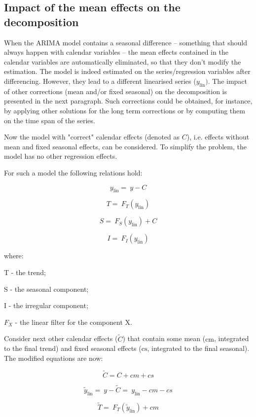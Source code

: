 \documentclass[
  letterpaper,
  DIV=11,
  numbers=noendperiod]{scrreprt}
\begin{document}
\hypertarget{impact-of-the-mean-effects-on-the-decomposition}{%
\subsection{Impact of the mean effects on the
decomposition}\label{impact-of-the-mean-effects-on-the-decomposition}}

When the ARIMA model contains a seasonal difference -- something that
should always happen with calendar variables -- the mean effects
contained in the calendar variables are automatically eliminated, so
that they don't modify the estimation. The model is indeed estimated on
the series/regression variables after differencing. However, they lead
to a different linearised series (\(y_{\text{lin}})\). The impact of
other corrections (mean and/or fixed seasonal) on the decomposition is
presented in the next paragraph. Such corrections could be obtained, for
instance, by applying other solutions for the long term corrections or
by computing them on the time span of the series.

Now the model with "correct" calendar effects (denoted as \(C\)), i.e.
effects without mean and fixed seasonal effects, can be considered. To
simplify the problem, the model has no other regression effects.

For such a model the following relations hold:

\[y_{\text{lin}} = \ y - C\]

\[T = \ F_{T}\left( y_{\text{lin}} \right)\]

\[S = \ F_{S}\left( y_{\text{lin}} \right) + C\]

\[I = \ F_{I}\left( y_{\text{lin}} \right)\]

where:

T - the trend;

S - the seasonal component;

I - the irregular component;

\(F_{X}\) - the linear filter for the component X.

Consider next other calendar effects (\(\widetilde{C}\)) that contain
some mean (\(\text{cm}\), integrated to the final trend) and fixed
seasonal effects (\(\text{cs}\), integrated to the final seasonal). The
modified equations are now:

\[\widetilde{C} = C + cm + cs\]

\[{\widetilde{y}}_{\text{lin}} = \ y - \widetilde{C} = \ y_{\text{lin}} - cm - cs\]

\[\widetilde{T} = \ F_{T}\left( {\widetilde{y}}_{\text{lin}} \right) + cm\]
\end{document}
